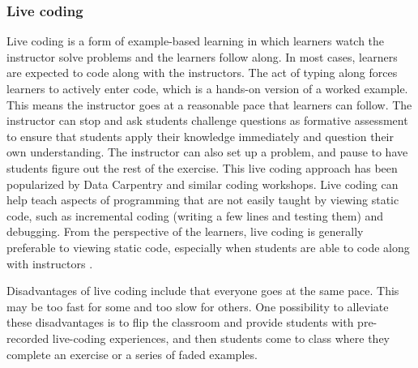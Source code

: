 \subsubsection{Live coding}\label{Livecoding}
Live coding is a form of example-based learning in which learners watch the instructor solve problems and the learners follow along. 
In most cases, learners are expected to code along with the instructors. 
The act of typing along forces learners to actively enter code, which is a hands-on version of a worked example.
This means the instructor goes at a reasonable pace that learners can follow.
The instructor can stop and ask students challenge questions as formative assessment to ensure that students apply their knowledge immediately and question their own understanding. 
The instructor can also set up a problem, and pause to have students figure out the rest of the exercise. 
This live coding approach has been popularized by Data Carpentry and similar coding workshops.
Live coding can help teach aspects of programming that are not easily taught by viewing static code, such as incremental coding (writing a few lines and testing them) and debugging. 
From the perspective of the learners, live coding is generally preferable to viewing static code, especially when students are able to code along with instructors \citep{raj_role_2018}.


Disadvantages of live coding include that everyone goes at the same pace.
This may be too fast for some and too slow for others.
One possibility to alleviate these disadvantages is to flip the classroom and provide students with pre-recorded live-coding experiences, and then students come to class where they complete an exercise or a series of faded examples. 


